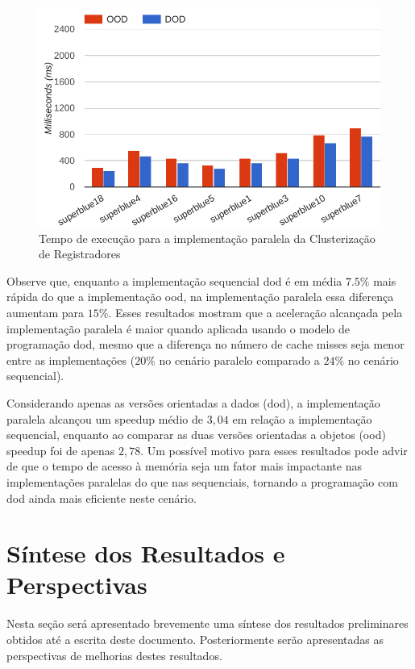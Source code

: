 \begin{figure}[ht]
    \centering
    \includegraphics[width=0.7\linewidth]{img/results/runtimeProblemC_parallel_rtree}
    \caption[Tempo de execução Problema~C versão paralela]{Tempo de execução para a implementação paralela da Clusterização de Registradores}
    \label{fig:runtimeProblemC_parallel_rtree}
\end{figure}

Observe que, enquanto a implementação sequencial \ac{dod} é em média $ 7.5 \% $ mais rápida do que a implementação \ac{ood}, na implementação paralela essa diferença aumentam para $ 15 \% $.
Esses resultados mostram que a aceleração alcançada pela implementação paralela é maior quando aplicada usando o modelo de programação \ac{dod}, mesmo que a diferença no número de cache misses seja menor entre as implementações ($ 20 \% $ no cenário paralelo comparado a $ 24 \% $ no cenário sequencial).

Considerando apenas as versões orientadas a dados (\ac{dod}), a implementação paralela alcançou um speedup médio de $ 3,04 $ em relação a implementação sequencial, enquanto ao comparar as duas versões  orientadas a objetos (\ac{ood}) speedup foi de apenas $ 2,78 $.
Um possível motivo para esses resultados pode advir de que o tempo de acesso à memória seja um fator mais impactante nas implementações paralelas do que nas sequenciais, tornando a programação com \ac{dod} ainda mais eficiente neste cenário.


\section{Síntese dos Resultados e Perspectivas}
\label{sec:sintese_resultado}

Nesta seção será apresentado brevemente uma síntese dos resultados preliminares obtidos até a escrita deste documento. Posteriormente serão apresentadas as perspectivas de melhorias destes resultados.


